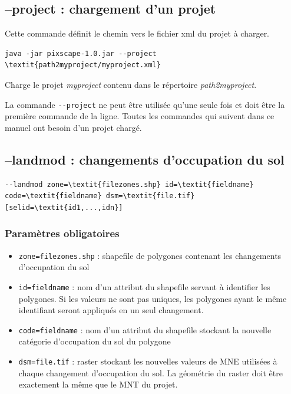 \documentclass{report}
\begin{document}
\subsection{--project : chargement d'un projet}
Cette commande définit le chemin vers le fichier xml du projet à charger.
\begin{Verbatim}[commandchars=\\\{\}]
java -jar pixscape-1.0.jar --project \textit{path2myproject/myproject.xml}
\end{Verbatim}
Charge le projet \textit{myproject} contenu dans le répertoire \textit{path2myproject}.

La commande \verb|--project| ne peut être utilisée qu'une seule fois et doit être la première commande de la ligne.
Toutes les commandes qui suivent dans ce manuel ont besoin d'un projet chargé.

\subsection{--landmod : changements d'occupation du sol}

\begin{Verbatim}[commandchars=\\\{\}]
--landmod zone=\textit{filezones.shp} id=\textit{fieldname} code=\textit{fieldname} dsm=\textit{file.tif} [selid=\textit{id1,...,idn}]
\end{Verbatim}

\subsubsection{Paramètres obligatoires}
\begin{itemize}
	\item \verb|zone=filezones.shp| : shapefile de polygones contenant les changements d'occupation du sol
	\item \verb|id=fieldname| : nom d'un attribut du shapefile servant à identifier les polygones. Si les valeurs ne sont pas uniques, les polygones ayant le même identifiant seront appliqués en un seul changement.
	\item \verb|code=fieldname| : nom d'un attribut du shapefile stockant la nouvelle catégorie d'occupation du sol du polygone
	\item \verb|dsm=file.tif| : raster stockant les nouvelles valeurs de MNE utilisées à chaque changement d'occupation du sol. La géométrie du raster doit être exactement la même que le MNT du projet.
\end{itemize}
\end{document}
